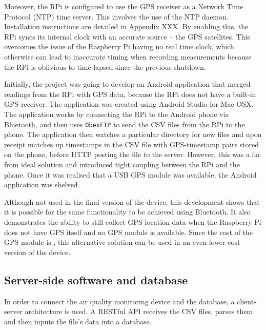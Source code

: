 \documentclass[11pt]{report}
\begin{document}
Moreover, the RPi is configured to use the GPS receiver as a Network Time Protocol (NTP) time server. This involves the use of the NTP daemon. Installation instructions are detailed in Appendix XXX. By enabling this, the RPi syncs its internal clock with an accurate source -- the GPS satellites. This overcomes the issue of the Raspberry Pi having no real time clock, which otherwise can lead to inaccurate timing when recording measurements because the RPi is oblivious to time lapsed since the previous shutdown.

Initially, the project was going to develop an Android application that merged readings from the RPi with GPS data, because the RPi does not have a built-in GPS receiver. The application was created using Android Studio for Mac OSX. The application works by connecting the RPi to the Android phone via Bluetooth, and then uses \texttt{ObexFTP} to send the CSV files from the RPi to the phone. The application then watches a particular directory for new files and upon receipt matches up timestamps in the CSV file with GPS-timestamp pairs stored on the phone, before HTTP posting the file to the server. However, this was a far from ideal solution and introduced tight coupling between the RPi and the phone. Once it was realised that a USB GPS module was available, the Android application was shelved.


Although not used in the final version of the device, this development shows that it is possible for the same functionality to be achieved using Bluetooth. It also demonstrates the ability to still collect GPS location data when the Raspberry Pi does not have GPS itself and no GPS module is available. Since the cost of the GPS module is , this alternative solution can be used in an even lower cost version of the device.



\subsection{Server-side software and database} \label{server_software}

In order to connect the air quality monitoring device and the database, a client-server architecture is used. A RESTful API receives the CSV files, parses them and then inputs the file's data into a database.
\end{document}
